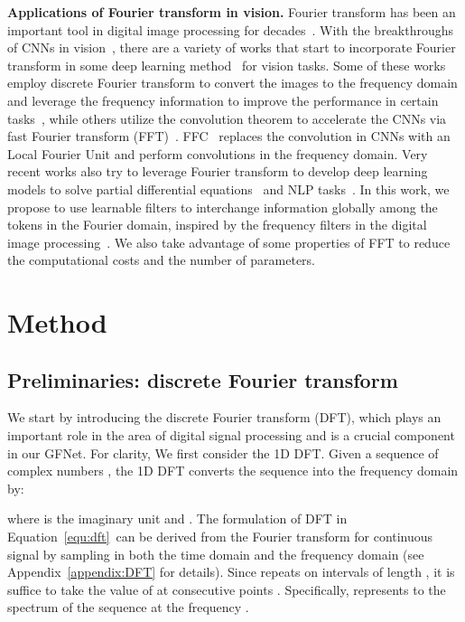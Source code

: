 \documentclass{article}
\numberwithin{equation}{section}
\newcommand{\paragrapha}[2][1pt]{\vspace{#1}\noindent\textbf{#2}}
\begin{document}
\paragrapha{Applications of Fourier transform in vision. } Fourier transform has been an important tool in digital image processing for decades~\cite{pitas2000digital,baxes1994digital}.   With the breakthroughs of CNNs in vision~\cite{he2016deep,he2017mask}, there are a variety of works that start to incorporate Fourier transform in some deep learning method~\cite{li2020falcon,yang2020fda,ding2017circnn,lee2018single,chi2020fast} for vision tasks. Some of these works employ discrete Fourier transform to convert the images to the frequency domain and leverage the frequency information to improve the performance in certain tasks~\cite{lee2018single,yang2020fda}, while others utilize the convolution theorem to accelerate the CNNs via fast Fourier transform (FFT)~\cite{li2020falcon,ding2017circnn}. FFC~\cite{chi2020fast} replaces the convolution in CNNs with an Local Fourier Unit and perform convolutions in the frequency domain.  Very recent works also try to leverage Fourier transform to develop deep learning models to solve partial differential equations~\cite{li2020fourier} and NLP tasks~\cite{lee2021fnet}. In this work, we propose to use learnable filters to interchange information globally among the tokens in the Fourier domain, inspired by the frequency filters in the digital image processing~\cite{pitas2000digital}. We also take advantage of some properties of FFT to reduce the computational costs and the number of parameters.


\section{Method}
\subsection{Preliminaries: discrete Fourier transform}\label{sec:dft}
We start by introducing the discrete Fourier transform (DFT), which plays an important role in the area of digital signal processing and is a crucial component in our GFNet. For clarity, We first consider the 1D DFT. Given a sequence of  complex numbers , the 1D DFT converts the sequence into the frequency domain by:

where  is the imaginary unit and . The formulation of DFT in Equation~\eqref{equ:dft}~can be derived from the Fourier transform for continuous signal by sampling in both the time domain and the frequency domain (see Appendix~\ref{appendix:DFT} for details). Since  repeats on intervals of length , it is suffice to take the value of  at  consecutive points . Specifically,  represents to the spectrum of the sequence  at the frequency . 
\end{document}
